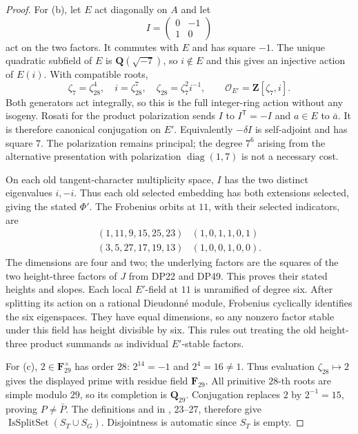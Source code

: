 \begin{proof}
For (b), let $E$ act diagonally on $A$ and let
\[
 I=\begin{pmatrix}0&-1\\1&0\end{pmatrix}
\]
act on the two factors. It commutes with $E$ and has square $-1$.
The unique quadratic subfield of $E$ is $\mathbf Q(\sqrt{-7})$,
so $i\notin E$ and this gives an injective action of $E(i)$.
With compatible roots,
\[
 \zeta _7=\zeta _{28}^4,\quad i=\zeta _{28}^7,\quad
 \zeta _{28}=\zeta _7^2i^{-1},\qquad
 \mathcal O_{E'}=\mathbf Z[\zeta _7,i].
\]
Both generators act integrally, so this is the full integer-ring
action without any isogeny.
Rosati for the product polarization sends $I$ to
$I^{\mathsf T}=-I$ and $a\in E$ to $\bar a$.
It is therefore canonical conjugation on $E'$.
Equivalently $-\delta I$ is self-adjoint and has square $7$.
The polarization remains principal; the degree $7^6$ arising from
the alternative presentation with polarization
$\operatorname{diag}(1,7)$ is not a necessary cost.

On each old tangent-character multiplicity space, $I$ has the
two distinct eigenvalues $i,-i$. Thus each old selected embedding
has both extensions selected, giving the stated $\Phi'$.
The Frobenius orbits at $11$, with their selected indicators, are
\[
 \begin{array}{c|c}
 (1,11,9,15,25,23)&(1,0,1,1,0,1)\\
 (3,5,27,17,19,13)&(1,0,0,1,0,0).
 \end{array}
\]
The dimensions are four and two; the underlying factors are the
squares of the two height-three factors of $J$ from DP22 and DP49.
This proves their stated heights and slopes.
Each local $E'$-field at $11$ is unramified of degree six.
After splitting its action on a rational Dieudonné module,
Frobenius cyclically identifies the six eigenspaces. They have
equal dimensions, so any nonzero factor stable under this field
has height divisible by six. This rules out treating the old
height-three product summands as individual $E'$-stable factors.

For (c), $2\in\mathbf F_{29}^\times$ has order $28$:
$2^{14}=-1$ and $2^4=16\ne1$.
Thus evaluation $\zeta _{28}\mapsto2$ gives the displayed prime
with residue field $\mathbf F_{29}$.
All primitive $28$-th roots are simple modulo $29$, so its
completion is $\mathbf Q_{29}$.
Conjugation replaces $2$ by $2^{-1}=15$, proving $P\ne\bar P$.
The definitions  and  in
,
23--27, therefore give
$\operatorname{IsSplitSet}(S_T\cup S_G)$.
Disjointness is automatic since $S_T$ is empty.


\end{proof}
